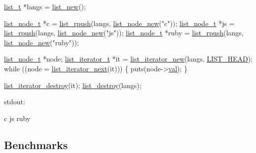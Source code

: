 \begin{DoxyCode}
\hyperlink{structlist__t}{list\_t} *langs = \hyperlink{list_8c_a9dd3eafdb56dcc64689f78fb4acdff3f}{list\_new}();

\hyperlink{structlist__node}{list\_node\_t} *c = \hyperlink{list_8c_a4edfa9b7742154bff4fc2cb05d044af9}{list\_rpush}(langs, \hyperlink{list_8h_a4ef36e0519514ac481d0d7e0b439d431}{list\_node\_new}(\textcolor{stringliteral}{"c"}));
\hyperlink{structlist__node}{list\_node\_t} *js = \hyperlink{list_8c_a4edfa9b7742154bff4fc2cb05d044af9}{list\_rpush}(langs, \hyperlink{list_8h_a4ef36e0519514ac481d0d7e0b439d431}{list\_node\_new}(\textcolor{stringliteral}{"js"}));
\hyperlink{structlist__node}{list\_node\_t} *ruby = \hyperlink{list_8c_a4edfa9b7742154bff4fc2cb05d044af9}{list\_rpush}(langs, \hyperlink{list_8h_a4ef36e0519514ac481d0d7e0b439d431}{list\_node\_new}(\textcolor{stringliteral}{"ruby"}));

\hyperlink{structlist__node}{list\_node\_t} *node;
\hyperlink{structlist__iterator__t}{list\_iterator\_t} *it = \hyperlink{list_8h_a3c956afda343b4a6aaf68fbd4b446733}{list\_iterator\_new}(langs, 
      \hyperlink{list_8h_a2c3af7de0b7ab9c3a84fbc039e75ec66abdf0fd732c6a91b57c5cbea177f1ae00}{LIST\_HEAD});
\textcolor{keywordflow}{while} ((node = \hyperlink{list_8h_a2e5db981e32d3aef49ea79505a0615a6}{list\_iterator\_next}(it))) \{
  puts(node->\hyperlink{structlist__node_a129de89b4c110fa54377ef16ab128ce0}{val});
\}

\hyperlink{list_8h_ad16fa29ddbb444070ea65f871e1c0ba2}{list\_iterator\_destroy}(it);
\hyperlink{list_8c_ac2d2be572a896cccd0e76d56eeefcbdb}{list\_destroy}(langs);
\end{DoxyCode}


stdout\+: \begin{DoxyVerb}c
js
ruby
\end{DoxyVerb}


\subsection*{Benchmarks}



